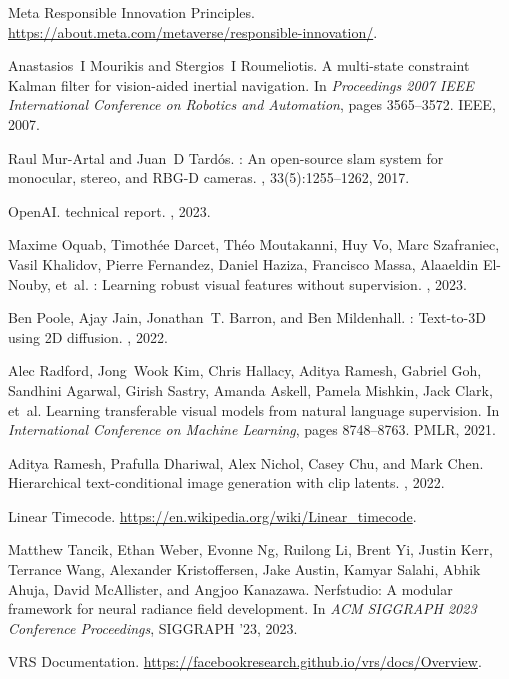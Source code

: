 \documentclass[10pt,twocolumn,letterpaper]{article}
\begin{document}
\begin{thebibliography}{10}
Meta {R}esponsible {I}nnovation {P}rinciples.
\newblock \url{https://about.meta.com/metaverse/responsible-innovation/}.

Anastasios~I Mourikis and Stergios~I Roumeliotis.
\newblock A multi-state constraint {K}alman filter for vision-aided inertial
  navigation.
\newblock In {\em Proceedings 2007 IEEE International Conference on Robotics
  and Automation}, pages 3565--3572. IEEE, 2007.

Raul Mur-Artal and Juan~D Tard{\'o}s.
: An open-source slam system for monocular, stereo, and
  {RBG-D} cameras.
, 33(5):1255--1262, 2017.

OpenAI.
 technical report.
, 2023.

Maxime Oquab, Timoth{\'e}e Darcet, Th{\'e}o Moutakanni, Huy Vo, Marc
  Szafraniec, Vasil Khalidov, Pierre Fernandez, Daniel Haziza, Francisco Massa,
  Alaaeldin El-Nouby, et~al.
: Learning robust visual features without supervision.
, 2023.

Ben Poole, Ajay Jain, Jonathan~T. Barron, and Ben Mildenhall.
: {Text-to-3D} using {2D} diffusion.
, 2022.

Alec Radford, Jong~Wook Kim, Chris Hallacy, Aditya Ramesh, Gabriel Goh,
  Sandhini Agarwal, Girish Sastry, Amanda Askell, Pamela Mishkin, Jack Clark,
  et~al.
\newblock Learning transferable visual models from natural language
  supervision.
\newblock In {\em International Conference on Machine Learning}, pages
  8748--8763. PMLR, 2021.

Aditya Ramesh, Prafulla Dhariwal, Alex Nichol, Casey Chu, and Mark Chen.
\newblock Hierarchical text-conditional image generation with clip latents.
, 2022.

Linear {T}imecode.
\newblock \url{https://en.wikipedia.org/wiki/Linear_timecode}.

Matthew Tancik, Ethan Weber, Evonne Ng, Ruilong Li, Brent Yi, Justin Kerr,
  Terrance Wang, Alexander Kristoffersen, Jake Austin, Kamyar Salahi, Abhik
  Ahuja, David McAllister, and Angjoo Kanazawa.
\newblock Nerfstudio: A modular framework for neural radiance field
  development.
\newblock In {\em ACM SIGGRAPH 2023 Conference Proceedings}, SIGGRAPH '23,
  2023.

{VRS} {D}ocumentation.
\newblock \url{https://facebookresearch.github.io/vrs/docs/Overview}.

\end{thebibliography}
\end{document}
